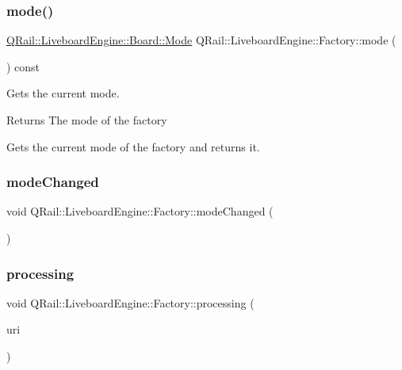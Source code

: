 \subsubsection{\texorpdfstring{mode()}{mode()}}
{\footnotesize\ttfamily \mbox{\hyperlink{classQRail_1_1LiveboardEngine_1_1Board_a0ab6d318f405895f62c6e98cb2d86c6e}{Q\+Rail\+::\+Liveboard\+Engine\+::\+Board\+::\+Mode}} Q\+Rail\+::\+Liveboard\+Engine\+::\+Factory\+::mode (\begin{DoxyParamCaption}{ }\end{DoxyParamCaption}) const}



Gets the current mode. 

\begin{DoxyReturn}{Returns}
The mode of the factory
\end{DoxyReturn}
Gets the current mode of the factory and returns it. \mbox{\label{classQRail_1_1LiveboardEngine_1_1Factory_a77c3c40bf35560a3893a3f162156f41a}} 
\subsubsection{\texorpdfstring{modeChanged}{modeChanged}}
{\footnotesize\ttfamily void Q\+Rail\+::\+Liveboard\+Engine\+::\+Factory\+::mode\+Changed (\begin{DoxyParamCaption}{ }\end{DoxyParamCaption})\hspace{0.3cm}{\ttfamily [signal]}}

\mbox{\label{classQRail_1_1LiveboardEngine_1_1Factory_ab71b4c2d7d4f99fd4b12b0e92c0d8965}} 
\subsubsection{\texorpdfstring{processing}{processing}}
{\footnotesize\ttfamily void Q\+Rail\+::\+Liveboard\+Engine\+::\+Factory\+::processing (\begin{DoxyParamCaption}\item[{const Q\+Url \&}]{uri }\end{DoxyParamCaption})\hspace{0.3cm}{\ttfamily [signal]}}

